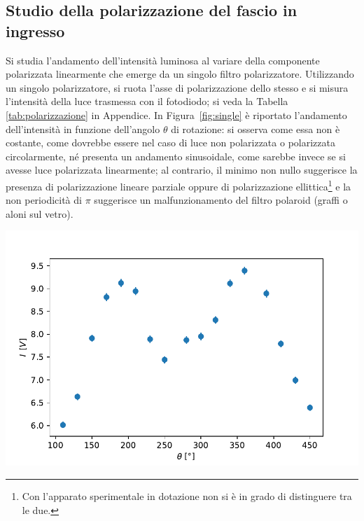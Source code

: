 \documentclass[10pt,oneside,a4paper]{article}
\newenvironment{Figure}
  {\par\medskip\noindent\minipage{\linewidth}}
  {\endminipage\par\medskip}
\begin{document}
\begin{multicols}{2}
\subsection{Studio della polarizzazione del fascio in ingresso}\label{sec:polarizzazione}
Si studia l'andamento dell'intensità luminosa al variare della componente polarizzata linearmente che emerge da un singolo filtro polarizzatore. Utilizzando un singolo polarizzatore, si ruota l'asse di polarizzazione dello stesso e si misura l'intensità della luce trasmessa con il fotodiodo; si veda la Tabella \ref{tab:polarizzazione} in Appendice. In Figura~\ref{fig:single} è riportato l'andamento dell'intensità in funzione dell'angolo $\theta$ di rotazione: si osserva come essa non è costante, come dovrebbe essere nel caso di luce non polarizzata o polarizzata circolarmente, né presenta un andamento sinusoidale, come sarebbe invece se si avesse luce polarizzata linearmente; al contrario, il minimo non nullo suggerisce la presenza di polarizzazione lineare parziale oppure di polarizzazione ellittica\footnote{Con l'apparato sperimentale in dotazione non si è in grado di distinguere tra le due.} e la non periodicità di $\pi$ suggerisce un malfunzionamento del filtro polaroid (graffi o aloni sul vetro).

\begin{Figure}
	\begin{center}
	\includegraphics[width=\linewidth]{single.pdf}
	\label{fig:single}
	\end{center}
\end{Figure}


\end{multicols}
\end{document}

